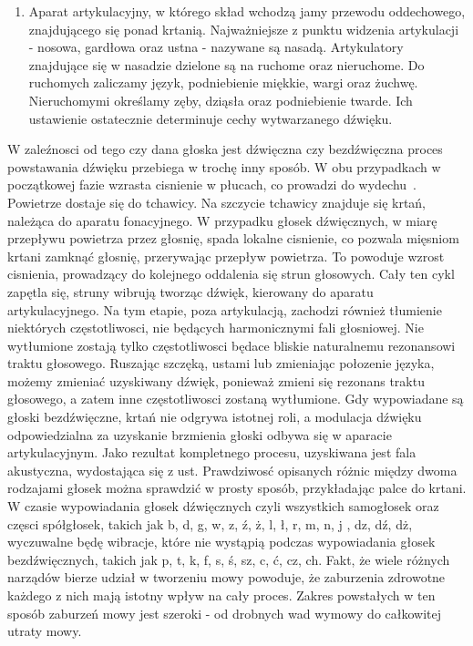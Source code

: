 \documentclass[a4paper,12 pt]{report}
\begin{document}
\begin{enumerate}
\begin{figure}[!htbp]
\end{figure}
\FloatBarrier


\item Aparat artykulacyjny, w którego skład wchodzą jamy przewodu oddechowego, znajdującego się ponad krtanią. Najważniejsze z punktu widzenia artykulacji - nosowa, gardłowa oraz ustna - nazywane są nasadą. Artykulatory znajdujące się w nasadzie dzielone są na ruchome oraz nieruchome. Do ruchomych zaliczamy język, podniebienie miękkie, wargi oraz żuchwę. Nieruchomymi określamy zęby, dziąsła oraz podniebienie twarde. Ich ustawienie ostatecznie determinuje cechy wytwarzanego dźwięku. 
\end{enumerate}
 W zaleźnosci od tego czy dana głoska jest dźwięczna czy bezdźwięczna proces powstawania dźwięku przebiega w trochę inny sposób. W obu przypadkach w początkowej fazie wzrasta cisnienie w płucach, co prowadzi do wydechu~\cite{produkcja_mowy}. Powietrze dostaje się do tchawicy. Na szczycie tchawicy znajduje się krtań, należąca do aparatu fonacyjnego. W przypadku głosek dźwięcznych, w miarę przepływu powietrza przez głosnię, spada lokalne cisnienie, co pozwala mięsniom krtani zamknąć głosnię, przerywając przepływ powietrza. To powoduje wzrost cisnienia, prowadzący do kolejnego oddalenia się strun głosowych. Cały ten cykl zapętla się, struny wibrują tworząc dźwięk, kierowany do aparatu artykulacyjnego. Na tym etapie, poza artykulacją, zachodzi również tłumienie niektórych częstotliwosci, nie będących harmonicznymi fali głosniowej. Nie wytłumione zostają tylko częstotliwosci będace bliskie naturalnemu rezonansowi traktu głosowego. Ruszając szczęką, ustami lub zmieniając połozenie języka, możemy zmieniać uzyskiwany dźwięk, ponieważ zmieni się rezonans traktu głosowego, a zatem inne częstotliwosci zostaną wytłumione. Gdy wypowiadane są głoski bezdźwięczne, krtań nie odgrywa istotnej roli, a modulacja dźwięku odpowiedzialna za uzyskanie brzmienia głoski odbywa się w aparacie artykulacyjnym. Jako rezultat kompletnego procesu, uzyskiwana jest fala akustyczna, wydostająca się z ust. Prawdziwosć opisanych różnic między dwoma rodzajami głosek można sprawdzić w prosty sposób, przykładając palce do krtani. W czasie wypowiadania głosek dźwięcznych czyli wszystkich samogłosek oraz częsci spółgłosek, takich jak b, d, g, w, z, ź, ż, l, ł, r, m, n, j , dz, dź, dż, wyczuwalne będę wibracje, które nie wystąpią podczas wypowiadania głosek bezdźwięcznych, takich jak p, t, k, f, s, ś, sz, c, ć, cz, ch.
Fakt, że wiele różnych narządów bierze udział w tworzeniu mowy powoduje, że zaburzenia zdrowotne każdego z nich mają istotny wpływ na cały proces. Zakres powstałych w ten sposób zaburzeń mowy jest szeroki - od drobnych wad wymowy do całkowitej utraty mowy.
\end{document}
